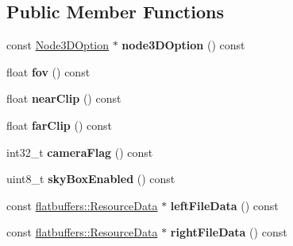 \subsection*{Public Member Functions}
\begin{DoxyCompactItemize}
\item 
\mbox{\label{structflatbuffers_1_1UserCameraOptions_a71c98d82b28a624273d45e067d8b9150}} 
const \hyperlink{structflatbuffers_1_1Node3DOption}{Node3\+D\+Option} $\ast$ {\bfseries node3\+D\+Option} () const
\item 
\mbox{\label{structflatbuffers_1_1UserCameraOptions_a24beacfbc05030d6f99f1ad9837e678d}} 
float {\bfseries fov} () const
\item 
\mbox{\label{structflatbuffers_1_1UserCameraOptions_a6e3935964fe28b7a4606f753276d1028}} 
float {\bfseries near\+Clip} () const
\item 
\mbox{\label{structflatbuffers_1_1UserCameraOptions_a492f12ceeef91144841d798f7142b887}} 
float {\bfseries far\+Clip} () const
\item 
\mbox{\label{structflatbuffers_1_1UserCameraOptions_a1ab305a588bd45ac0fb47e8d54985b3f}} 
int32\+\_\+t {\bfseries camera\+Flag} () const
\item 
\mbox{\label{structflatbuffers_1_1UserCameraOptions_a2f2b20021a28147f24249a461cc9020b}} 
uint8\+\_\+t {\bfseries sky\+Box\+Enabled} () const
\item 
\mbox{\label{structflatbuffers_1_1UserCameraOptions_a56d994c5ea14dc63b0dc07f0d6b2d982}} 
const \hyperlink{structflatbuffers_1_1ResourceData}{flatbuffers\+::\+Resource\+Data} $\ast$ {\bfseries left\+File\+Data} () const
\item 
\mbox{\label{structflatbuffers_1_1UserCameraOptions_a7c56aab0402a820361bb0da2c682b2b5}} 
const \hyperlink{structflatbuffers_1_1ResourceData}{flatbuffers\+::\+Resource\+Data} $\ast$ {\bfseries right\+File\+Data} () const

\end{DoxyCompactItemize}
